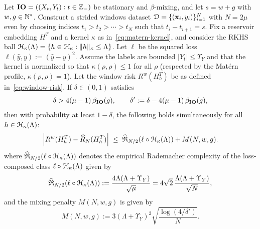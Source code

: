 \begin{corollary}
\label{cor:mse_rkhs_beta}
Let ${\mathbf{IO}}=((X_t,Y_t):t\in{\mathbb{Z}}_-)$ be stationary and $\beta$-mixing, and let $s=w+g$ with $w,g\in {\mathbb{N}}^\ast$.
Construct a strided windows dataset
${\mathcal{D}}=\{({\mathbf{x}}_i,y_i)\}_{i=1}^{N}$ with $N=2\mu$ even by choosing indices
$t_1>t_2>\cdots>t_N$ such that $t_i-t_{i+1} = s$.
Fix a reservoir embedding $H^T$ and a kernel $\kappa$ as in~\cref{eq:matern-kernel},
and consider the RKHS ball
${\mathcal{H}}_{\kappa}(\Lambda) = \{h\in{\mathcal{H}}_{\kappa}:\|h\|_\kappa\le \Lambda\}$.
Let $\ell$ be the squared loss $\ell(\hat y,y):=(\hat y-y)^2$.
Assume the labels are bounded $|Y_t|\le \Upsilon_Y$ and that the kernel is normalized so that
$\kappa(\rho,\rho)\le 1$ for all $\rho$ (respected by the Mat\'ern profile, $\kappa(\rho,\rho)=1$).
Let the window risk $R^w(H_h^T)$ be as defined in~\cref{eq:window-risk}.
If $\delta\in(0,1)$ satisfies
\[
\delta>4(\mu-1)\,\beta_{\mathbf{IO}}(g),
\qquad
\delta':=\delta-4(\mu-1)\,\beta_{\mathbf{IO}}(g),
\]
then with probability at least $1-\delta$, the following holds simultaneously for all
$h\in{\mathcal{H}}_{\kappa}(\Lambda)$:
\begin{equation}
    \left| R^w(H_h^T)-\widehat R_N(H_h^T) \right|
    \;\le\; \widehat{\mathfrak{R}}_{N/2}(\ell \circ {\mathcal{H}}_{\kappa}(\Lambda)) + M(N,w,g).
\end{equation}
where $\widehat{\mathfrak{R}}_{N/2}(\ell \circ {\mathcal{H}}_{\kappa}(\Lambda))$ denotes the empirical Rademacher complexity of the loss-composed class $\ell \circ {\mathcal{H}}_{\kappa}(\Lambda)$ given by
\begin{equation}
    \widehat{\mathfrak{R}}_{N/2}(\ell \circ {\mathcal{H}}_{\kappa}(\Lambda)) := \frac{4\Lambda(\Lambda+\Upsilon_Y)}{\sqrt{\mu}} = 4\sqrt{2}\,\frac{\Lambda(\Lambda+\Upsilon_Y)}{\sqrt{N}},
\end{equation}
and the mixing penalty $M(N,w,g)$ is given by
\begin{equation}
    M(N,w,g) := 3(\Lambda+\Upsilon_Y)^2\sqrt{\frac{\log(4/\delta')}{N}}.
\end{equation}
\end{corollary}

